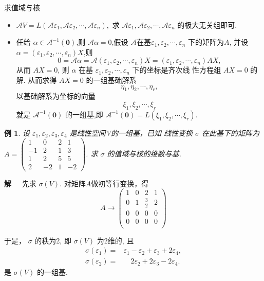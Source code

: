 \documentclass[13pt]{beamer}
\newtheorem{exa}{例}
\def\sol{{\bf 解~~ }}
\def\A{\mathscr{A}}
\def\0{\mathbf{0}}
\begin{document}
\begin{frame}
{求值域与核}
\begin{itemize}
\item  $\A V=L\left(\A  \varepsilon_{1}, \A  \varepsilon_{2}, \cdots, \A  \varepsilon_{n}\right),$ 求 $\A  \varepsilon_{1}, \A  \varepsilon_{2}, \cdots, \A  \varepsilon_{n}$ 的极大无关组即可.
\item 任给 $\alpha \in \A^{-1}(\0)$,则 $\A  \alpha=0$,假设 $\A$在基$\varepsilon_{1}, \varepsilon_{2}, \cdots, \varepsilon_{n}$ 下的矩阵为$A$, 并设 $\alpha=\left(\varepsilon_{1}, \varepsilon_{2}, \cdots, \varepsilon_{n}\right) X$,则
$$0=\A  \alpha=\A \left(\varepsilon_{1}, \varepsilon_{2}, \cdots, \varepsilon_{n}\right) X=\left(\varepsilon_{1}, \varepsilon_{2}, \cdots, \varepsilon_{n}\right) A X,$$ 
从而 $A X=0$, 
则 $\alpha$ 在基 $\varepsilon_{1}, \varepsilon_{2}, \cdots, \varepsilon_{n}$ 下的坐标是齐次线
性方程组 $A X=0$ 的解.
从而求得 $A X=0$ 的一组基础解系 $$\eta_{1}, \eta_{2}, \cdots, \eta_{r},$$ 以基础解系为坐标的向量
$$\xi_{1}, \xi_{2}, \cdots, \xi_{r}$$ 就是 $\A^{-1}(\0)$ 的一组基,即 $\A^{-1}(\0) =L\left(\xi_{1}, \xi_{2}, \cdots, \xi_{r}\right).$
\end{itemize}
\end{frame}


\begin{frame}
\begin{exa}
设 $\varepsilon_{1}, \varepsilon_{2}, \varepsilon_{3}, \varepsilon_{4}$ 是线性空间V的一组基，已知
	线性变换 $\sigma$ 在此基下的矩阵为 $A=\left(\begin{array}{cccc}1 & 0 & 2 & 1 \\ -1 & 2 & 1 & 3 \\ 1 & 2 & 5 & 5 \\ 2 & -2 & 1 & -2\end{array}\right)$.
求 $\sigma $ 的值域与核的维数与基.
\end{exa}



\end{frame}


\begin{frame}


\sol 
先求 $\sigma(V) .$ 
对矩阵$A$做初等行变换，得
$$A \rightarrow  \left(
\begin{array}{cccc}
1 & 0 & 2 & 1 \\
0 & 1 & \frac{3}{2} & 2 \\
0 & 0 & 0 & 0 \\
0 & 0 & 0 & 0 \\
\end{array}
\right)$$

于是，
$\sigma$ 的秩为2,
即 $\sigma(V)$ 为2维的, 且
\[
\begin{array}{lr}
\sigma\left(\varepsilon_{1}\right)=&\varepsilon_{1}-\varepsilon_{2}+\varepsilon_{3}+2 \varepsilon_{4}, \\
\sigma\left(\varepsilon_{2}\right)=& \quad 2 \varepsilon_{2}+2 \varepsilon_{3}-2 \varepsilon_{4}.
\end{array}
\]
 是 $\sigma(V)$ 的一组基.
\end{frame}
\end{document}
